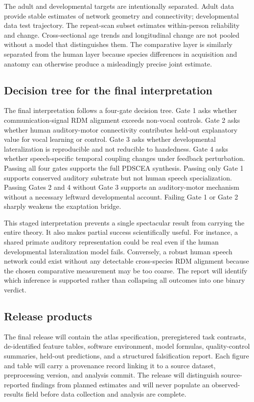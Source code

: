 \documentclass[conference]{IEEEtran}
\begin{document}
The adult and developmental targets are intentionally separated. Adult data provide stable estimates of network geometry and connectivity; developmental data test trajectory. The repeat-scan subset estimates within-person reliability and change. Cross-sectional age trends and longitudinal change are not pooled without a model that distinguishes them. The comparative layer is similarly separated from the human layer because species differences in acquisition and anatomy can otherwise produce a misleadingly precise joint estimate.

\subsection{Decision tree for the final interpretation}

The final interpretation follows a four-gate decision tree. Gate 1 asks whether communication-signal RDM alignment exceeds non-vocal controls. Gate 2 asks whether human auditory-motor connectivity contributes held-out explanatory value for vocal learning or control. Gate 3 asks whether developmental lateralization is reproducible and not reducible to handedness. Gate 4 asks whether speech-specific temporal coupling changes under feedback perturbation. Passing all four gates supports the full PDSCEA synthesis. Passing only Gate 1 supports conserved auditory substrate but not human speech specialization. Passing Gates 2 and 4 without Gate 3 supports an auditory-motor mechanism without a necessary leftward developmental account. Failing Gate 1 or Gate 2 sharply weakens the exaptation bridge.

This staged interpretation prevents a single spectacular result from carrying the entire theory. It also makes partial success scientifically useful. For instance, a shared primate auditory representation could be real even if the human developmental lateralization model fails. Conversely, a robust human speech network could exist without any detectable cross-species RDM alignment because the chosen comparative measurement may be too coarse. The report will identify which inference is supported rather than collapsing all outcomes into one binary verdict.

\subsection{Release products}

The final release will contain the atlas specification, preregistered task contrasts, de-identified feature tables, software environment, model formulas, quality-control summaries, held-out predictions, and a structured falsification report. Each figure and table will carry a provenance record linking it to a source dataset, preprocessing version, and analysis commit. The release will distinguish source-reported findings from planned estimates and will never populate an observed-results field before data collection and analysis are complete.
\end{document}
